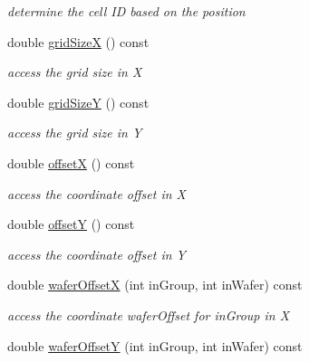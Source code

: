 \begin{DoxyCompactItemize}
\begin{DoxyCompactList}\small\item\em determine the cell ID based on the position \item\end{DoxyCompactList}\item 
double \hyperlink{class_d_d4hep_1_1_d_d_segmentation_1_1_wafer_grid_x_y_a026d6619714e9b753b42470e9f91426b}{gridSizeX} () const 
\begin{DoxyCompactList}\small\item\em access the grid size in X \item\end{DoxyCompactList}\item 
double \hyperlink{class_d_d4hep_1_1_d_d_segmentation_1_1_wafer_grid_x_y_a44872fa49d2809f7da860e3c32d7d666}{gridSizeY} () const 
\begin{DoxyCompactList}\small\item\em access the grid size in Y \item\end{DoxyCompactList}\item 
double \hyperlink{class_d_d4hep_1_1_d_d_segmentation_1_1_wafer_grid_x_y_a7f671c74b1fdf22b5fb8f755b57cbaa6}{offsetX} () const 
\begin{DoxyCompactList}\small\item\em access the coordinate offset in X \item\end{DoxyCompactList}\item 
double \hyperlink{class_d_d4hep_1_1_d_d_segmentation_1_1_wafer_grid_x_y_ae609c3cc10a490418e3913ccfa9246de}{offsetY} () const 
\begin{DoxyCompactList}\small\item\em access the coordinate offset in Y \item\end{DoxyCompactList}\item 
double \hyperlink{class_d_d4hep_1_1_d_d_segmentation_1_1_wafer_grid_x_y_a1ba9227771178c13a81dac8e9dd6be93}{waferOffsetX} (int inGroup, int inWafer) const 
\begin{DoxyCompactList}\small\item\em access the coordinate waferOffset for inGroup in X \item\end{DoxyCompactList}\item 
double \hyperlink{class_d_d4hep_1_1_d_d_segmentation_1_1_wafer_grid_x_y_a26b73391d98877b2d2a18bcc21c7a910}{waferOffsetY} (int inGroup, int inWafer) const 

\end{DoxyCompactItemize}
